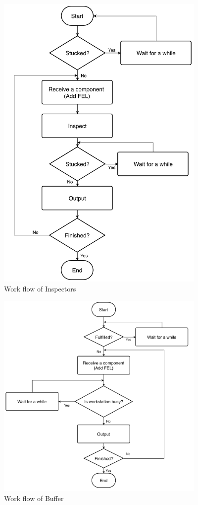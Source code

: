 \documentclass{article}
\begin{document}
\begin{figure}[htbp]
\begin{center}
\includegraphics[width=4in]{Flowchartsp.png}
\caption{Work flow of Inspectors}
\label{default}
\end{center}
\end{figure}

\begin{figure}[htbp]
\begin{center}
\includegraphics[width=4in]{Flowchartbuffer.png}
\caption{Work flow of Buffer}
\label{default}
\end{center}
\end{figure}
\end{document}
